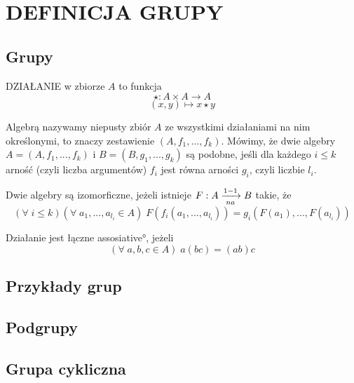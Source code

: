 \section{DEFINICJA GRUPY}

\subsection{Grupy}

\pdef

{\color{def}DZIAŁANIE} w zbiorze $A$ to funkcja
$$\star:A\times A\to A$$
$$(x, y)\mapsto x\star y$$

\kdef

Algebrą nazywamy niepusty zbiór $A$ ze wszystkimi działaniami na nim określonymi, to znaczy zestawienie $(A, f_1,...,f_k)$. Mówimy, że dwie algebry $A=(A, f_1,...,f_k)$ i $B=(B, g_1,...,g_k)$ są {\color{acc}podobne}, jeśli dla każdego $i\leq k$ arność (czyli liczba argumentów) $f_i$ jest równa arności $g_i$, czyli liczbie $l_i$.

Dwie algebry są {\color{def}izomorficzne}, jeżeli istnieje $F:A\xrightarrow[na]{1-1} B$ takie, że
$$(\forall\;i\leq k)(\forall\;a_1,...,a_{l_i}\in A)\;F(f_i(a_1,...,a_{l_i}))=g_i(F(a_1),...,F(a_{l_i}))$$

Działanie jest {\color{def}łączne} \ang{assosiative}, jeżeli
$$(\forall\;a,b,c\in A)\;a(bc)=(ab)c$$


\subsection{Przykłady grup}

\subsection{Podgrupy}

\subsection{Grupa cykliczna}